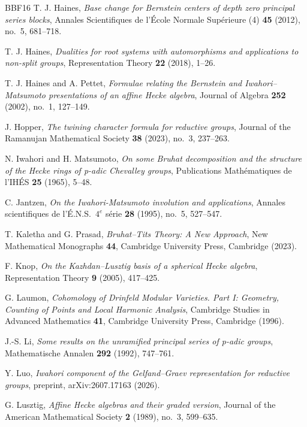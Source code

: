 \documentclass[12pt]{article}
\numberwithin{equation}{section}
\theoremstyle{definition}
\theoremstyle{remark}
\theoremstyle{plain}
\begin{document}
\begin{thebibliography}{BBF16}
 T. J. Haines, \textit{Base change for Bernstein centers of depth zero principal series blocks}, Annales Scientifiques de l'\'Ecole Normale Sup\'erieure (4) \textbf{45} (2012), no.~5, 681--718.

 T. J. Haines, \textit{Dualities for root systems with automorphisms and applications to non-split groups}, Representation Theory \textbf{22} (2018), 1--26.

 T. J. Haines and A. Pettet, \textit{Formulae relating the Bernstein and Iwahori--Matsumoto presentations of an affine Hecke algebra}, Journal of Algebra \textbf{252} (2002), no.~1, 127--149.

 J. Hopper, \textit{The twining character formula for reductive groups}, Journal of the Ramanujan Mathematical Society \textbf{38} (2023), no.~3, 237--263.

 N. Iwahori and H. Matsumoto, \textit{On some Bruhat decomposition and the structure of the Hecke rings of p-adic Chevalley groups}, Publications Math\'ematiques de l'IH\'ES \textbf{25} (1965), 5--48.

 C. Jantzen, \textit{On the Iwahori-Matsumoto involution and applications}, Annales scientifiques de l'\'E.N.S.\ $4^e$ s\'erie \textbf{28} (1995), no.~5, 527--547.

 T. Kaletha and G. Prasad, \textit{Bruhat--Tits Theory: A New Approach}, New Mathematical Monographs \textbf{44}, Cambridge University Press, Cambridge (2023).

 F. Knop, \textit{On the Kazhdan--Lusztig basis of a spherical Hecke algebra}, Representation Theory \textbf{9} (2005), 417--425.

 G. Laumon, \textit{Cohomology of Drinfeld Modular Varieties. Part I: Geometry, Counting of Points and Local Harmonic Analysis}, Cambridge Studies in Advanced Mathematics \textbf{41}, Cambridge University Press, Cambridge (1996).

 J.-S. Li, \textit{Some results on the unramified principal series of p-adic groups}, Mathematische Annalen \textbf{292} (1992), 747--761.

 Y. Luo, \textit{Iwahori component of the Gelfand--Graev representation for reductive groups}, preprint, arXiv:2607.17163 (2026).

 G. Lusztig, \textit{Affine Hecke algebras and their graded version}, Journal of the American Mathematical Society \textbf{2} (1989), no.~3, 599--635.


\end{thebibliography}
\end{document}
